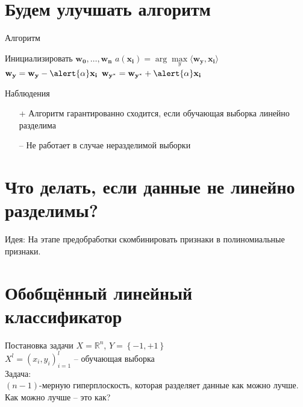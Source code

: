\documentclass[10pt]{beamer}
\begin{document}
\section{Будем улучшать алгоритм}

\begin{frame}{Алгоритм}
	\begin{algorithmic}[1]
            \State Инициализировать ${\mathbf{w_0}, \dots, \mathbf{w_n}}$
                 \State $a(\mathbf{x_i}) = \arg\max\limits_{y} \langle \mathbf{w_y}, \mathbf{x_i} \rangle$                 
                   \State $\mathbf{w_y} = \mathbf{w_y} - \alert{\alpha} \mathbf{x_i}$
                   \State $\mathbf{w_{y^{*}}} = \mathbf{w_{y^{*}}} + \alert{\alpha} \mathbf{x_i}$
                 \EndIf  
               \EndFor
           	\EndRepeat
        \EndFunction
    \end{algorithmic}
\end{frame}

\begin{frame} {Наблюдения}
    \begin{itemize} [<+->]
      \item[+] Алгоритм гарантированно сходится, если обучающая выборка линейно разделима
      \bigbreak
      \item[--] Не работает в случае неразделимой выборки 
    \end{itemize}
\end{frame}

\section{Что делать, если данные не линейно разделимы?}

\begin{frame}
  \alert{Идея}: На этапе предобработки скомбинировать признаки в полиномиальные признаки.
\end{frame}

\section{Обобщённый линейный классификатор}

\begin{frame}{Постановка задачи}
  $X = \mathbb{R}^n$, ${Y = \left\{ -1, + 1\right\}}$\\
  ${X^l = (x_i, y_i)_{i = 1}^l}$ -- обучающая выборка\\
  \bigbreak
  \alert{Задача}:\\
  $(n-1)$-мерную гиперплоскость, которая разделяет данные \alert{как можно лучше}.
  \bigbreak \pause
  Как можно лучше -- это как?
\end{frame}
\end{document}
